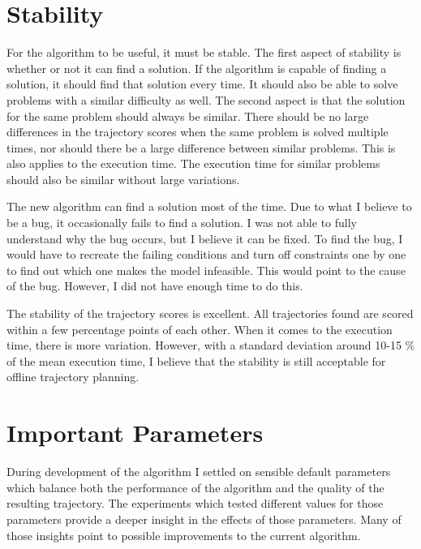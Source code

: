 \section{Stability}
\label{subsec:disc-stab}
For the algorithm to be useful, it must be stable. The first aspect of stability is whether or not it can find a solution. If the algorithm is capable of finding a solution, it should find that solution every time. It should also be able to solve problems with a similar difficulty as well. The second aspect is that the solution for the same problem should always be similar. There should be no large differences in the trajectory scores when the same problem is solved multiple times, nor should there be a large difference between similar problems. This is also applies to the execution time. The execution time for similar problems should also be similar without large variations.
\par
The new algorithm can find a solution most of the time. Due to what I believe to be a bug, it occasionally fails to find a solution. I was not able to fully understand why the bug occurs, but I believe it can be fixed. To find the bug, I would have to recreate the failing conditions and turn off constraints one by one to find out which one makes the model infeasible. This would point to the cause of the bug. However, I did not have enough time to do this.
\par
The stability of the trajectory scores is excellent. All trajectories found are scored within a few percentage points of each other. When it comes to the execution time, there is more variation. However, with a standard deviation around 10-15 \% of the mean execution time, I believe that the stability is still acceptable for offline trajectory planning.

\section{Important Parameters}
\label{section:imp-params}
During development of the algorithm I settled on sensible default parameters which balance both the performance of the algorithm and the quality of the resulting trajectory. The experiments which tested different values for those parameters provide a deeper insight in the effects of those parameters. Many of those insights point to possible improvements to the current algorithm.

